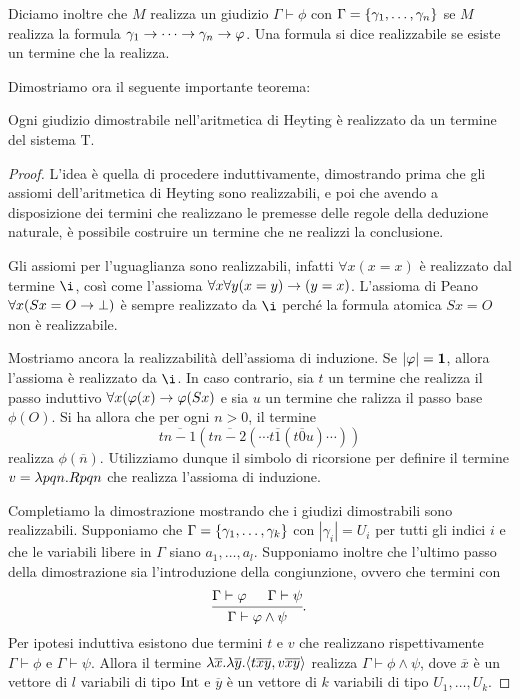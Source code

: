 \documentclass[]{marticle}
\begin{document}
Diciamo inoltre che $M$ realizza un giudizio $\Gamma \vdash\phi$ con
$\Gamma=\{\gamma_1,\dots,\gamma_n\}$ se $M$ realizza la formula
$\gamma_1\rightarrow\cdots\rightarrow\gamma_n\rightarrow \varphi$. Una formula si dice realizzabile se
esiste un termine che la realizza.

Dimostriamo ora il seguente importante teorema:
\begin{block}[Teorema]
    Ogni giudizio dimostrabile nell'aritmetica di Heyting \`e realizzato da un
    termine del sistema T.
\end{block}
\begin{proof}
    L'idea \`e quella di procedere induttivamente, dimostrando prima che gli
    assiomi dell'aritmetica di Heyting sono realizzabili, e poi che avendo a
    disposizione dei termini che realizzano le premesse delle regole della
    deduzione naturale, \`e possibile costruire un termine che ne realizzi la
    conclusione.

    Gli assiomi per l'uguaglianza sono realizzabili, infatti $\forall x(x=x)$
    \`e realizzato dal termine $\i$, cos\`i come l'assioma $\forall x\forall y
    (x=y)\rightarrow(y=x)$. 
    L'assioma di Peano $\forall x (Sx=O\rightarrow \bot)$ \`e sempre realizzato da $\i$
    perch\'e la formula atomica $Sx=O$ non \`e realizzabile.

    Mostriamo ancora la realizzabilit\`a dell'assioma di induzione. Se
    $|\varphi|=\text{\textbf{1}}$, allora l'assioma \`e realizzato da $\i$. In caso contrario,
    sia $t$ un termine che realizza il passo induttivo $\forall x(\varphi(x) \rightarrow
    \varphi(Sx)$ e sia $u$ un termine che ralizza il passo base $\phi(O)$. Si ha
    allora che per ogni $n>0$, il termine
    \[
        t\overline{n-1}(t \overline{n-2}(\cdots t \overline{1}( t \overline{0} u
        )\cdots))
    \]
    realizza $\phi(\overline{n})$. Utilizziamo dunque il simbolo di ricorsione
    per definire il termine $v = \lambda pqn. Rpqn$ che realizza l'assioma di
    induzione.

    Completiamo la dimostrazione mostrando che i giudizi dimostrabili sono
    realizzabili. Supponiamo che $\Gamma = \{\gamma_1, \dots , \gamma_k\}$
    con $|\gamma_i| = U_i$ per tutti gli indici $i$ e che le variabili libere in
    $\Gamma$ siano $a_1, \dots, a_l$. Supponiamo inoltre che l'ultimo passo
    della dimostrazione sia l'introduzione della congiunzione, ovvero che
    termini con
    \[
        \begin{prooftree}
            \hypo{\Gamma\vdash \phi}
            \hypo{\Gamma\vdash \psi}
            \infer2{\Gamma\vdash \phi\land\psi}
        \end{prooftree}.
    \]
    Per ipotesi induttiva esistono due termini $t$ e $v$ che realizzano
    rispettivamente $\Gamma \vdash\phi$ e $\Gamma \vdash\psi$. Allora il termine
    $\lambda \overline{x}. \lambda \overline{y}. \langle t\overline{x} \overline{y},v
    \overline{x} \overline{y} \rangle$ realizza $\Gamma \vdash \phi \land \psi$, dove
    $\overline{x}$ \`e un vettore di $l$ variabili di tipo $\text{Int}$ e
    $\overline{y}$ \`e un vettore di $k$ variabili di tipo $U_1, \dots, U_k$.


\end{proof}
\end{document}
